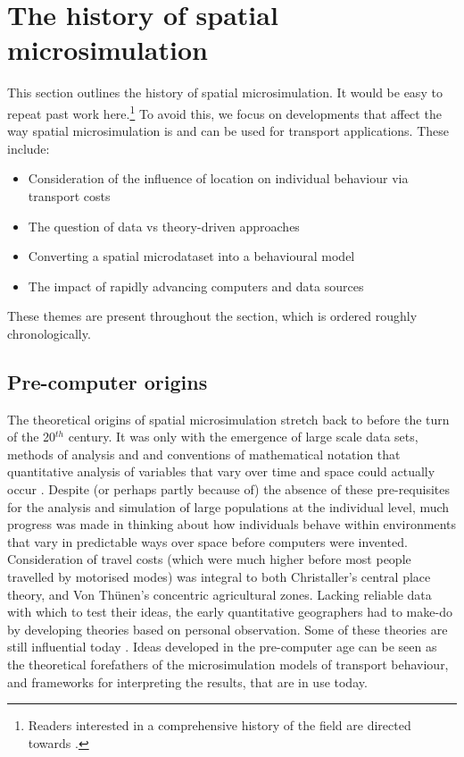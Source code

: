 \section{The history of spatial microsimulation}
\label{s:history}
This section outlines the history of spatial microsimulation. It would
be easy to repeat past work here.\footnote{Readers interested in a
comprehensive history of the field are directed towards
\citet{ballas2003microsimulation-30-years}.} To avoid this, we focus on
developments that affect the way spatial microsimulation
is and can be used for transport applications. These include:
\begin{itemize}
 \item Consideration of the influence of location on individual behaviour via
 transport costs 
 \item The question of data vs theory-driven approaches
 \item Converting a spatial microdataset into a behavioural model
 \item The impact of rapidly advancing computers and data sources
\end{itemize}
These themes are present throughout the section, which is ordered
roughly chronologically.

\subsection{Pre-computer origins}
The theoretical origins of spatial microsimulation stretch back to before the
turn of the 20$^{th}$ century. It was only with the emergence of large scale
data sets, methods of analysis and and conventions of mathematical notation that
quantitative analysis of variables that vary over time and space could actually
occur \citep{ballas2003microsimulation-30-years}.
Despite (or perhaps partly because of) the absence of these pre-requisites for
the analysis and simulation of large populations at the individual level, much
progress was made in thinking about how individuals behave within environments
that vary in predictable ways over space before computers were invented.
Consideration of travel costs (which were much higher before most
people travelled by motorised modes) was integral to both Christaller's
central place theory, and Von Th\"{u}nen's concentric agricultural zones.
Lacking reliable data with which to test their ideas, the
early quantitative geographers had to make-do by
developing theories based on personal observation.
Some of these theories are still influential today \citep{Clarke1985}.
Ideas developed in the pre-computer age can be seen as the theoretical
forefathers of the microsimulation models of transport behaviour, and frameworks
for interpreting the results, that are in use today.

